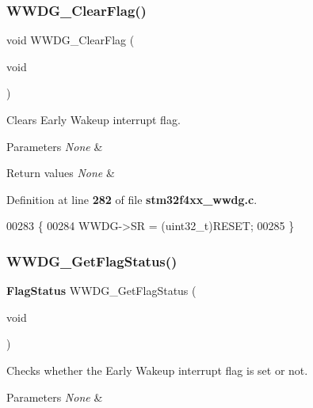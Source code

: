 \subsubsection{W\+W\+D\+G\+\_\+\+Clear\+Flag()}
{\footnotesize\ttfamily void W\+W\+D\+G\+\_\+\+Clear\+Flag (\begin{DoxyParamCaption}\item[{void}]{ }\end{DoxyParamCaption})}



Clears Early Wakeup interrupt flag. 


\begin{DoxyParams}{Parameters}
{\em None} & \\
\hline
\end{DoxyParams}

\begin{DoxyRetVals}{Return values}
{\em None} & \\
\hline
\end{DoxyRetVals}


Definition at line \textbf{ 282} of file \textbf{ stm32f4xx\+\_\+wwdg.\+c}.


\begin{DoxyCode}
00283 \{
00284   WWDG->SR = (uint32\_t)RESET;
00285 \}
\end{DoxyCode}
\mbox{\label{group__WWDG__Group3_ga7df4882d45918b9b8249dfca1e44fabc}} 
\subsubsection{W\+W\+D\+G\+\_\+\+Get\+Flag\+Status()}
{\footnotesize\ttfamily \textbf{ Flag\+Status} W\+W\+D\+G\+\_\+\+Get\+Flag\+Status (\begin{DoxyParamCaption}\item[{void}]{ }\end{DoxyParamCaption})}



Checks whether the Early Wakeup interrupt flag is set or not. 


\begin{DoxyParams}{Parameters}
{\em None} & \\
\hline
\end{DoxyParams}

